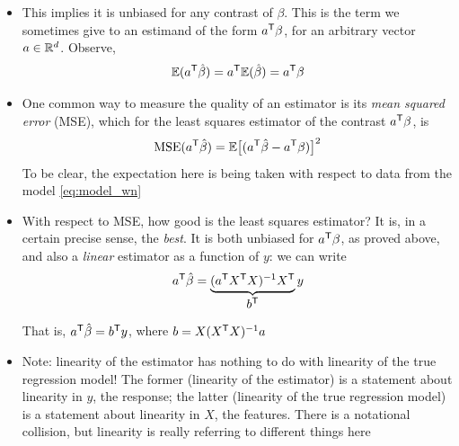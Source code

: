 \documentclass{article}
\begin{document}
\begin{itemize}
\item This implies it is unbiased for any contrast of $\beta$. This is the term 
  we sometimes give to an estimand of the form $a^{\mathsf{T}}\beta$, for an 
  arbitrary vector $a \in \mathbb{R}^d$. Observe, 
  \[
  \mathbb{E}(a^{\mathsf{T}} \hat{\beta}) = a^{\mathsf{T}} \mathbb{E}(\hat{\beta}) = a^{\mathsf{T}} \beta
  \]

\item One common way to measure the quality of an estimator is its \emph{mean
    squared error} (MSE), which for the least squares estimator  of the contrast $a^{\mathsf{T}} \beta$, is
  \[
  \mathrm{MSE}(a^{\mathsf{T}} \hat{\beta}) = \mathbb{E}\big[ (a^{\mathsf{T}} \hat{\beta} - a^{\mathsf{T}} \beta) \big]^2
  \]
  To be clear, the expectation here is being taken with respect to data from the
  model \eqref{eq:model_wn} 

\item With respect to MSE, how good is the least squares estimator? It is, in a
  certain precise sense, the \emph{best}. It is both unbiased for $a^{\mathsf{T}} \beta$,
  as proved above, and also a \emph{linear} estimator as a function of $y$: we
  can write  
  \[
  a^{\mathsf{T}} \hat{\beta} = \underbrace{(a^{\mathsf{T}} X^{\mathsf{T}} X)^{-1}
    X^{\mathsf{T}}}_{\textstyle \begin{array}{c} b^{\mathsf{T}} \end{array}} y  
  \]
  That is, $a^{\mathsf{T}} \hat{\beta} = b^{\mathsf{T}} y$, where $b = X (X^{\mathsf{T}} X)^{-1} a$ 


\item Note: linearity of the estimator has nothing to do with linearity of the
  true regression model! The former (linearity of the estimator) is a statement
  about linearity in $y$, the response; the latter (linearity of the true
  regression model) is a statement about linearity in $X$, the features. There
  is a notational collision, but linearity is really referring to different
  things here 


\end{itemize}
\end{document}
